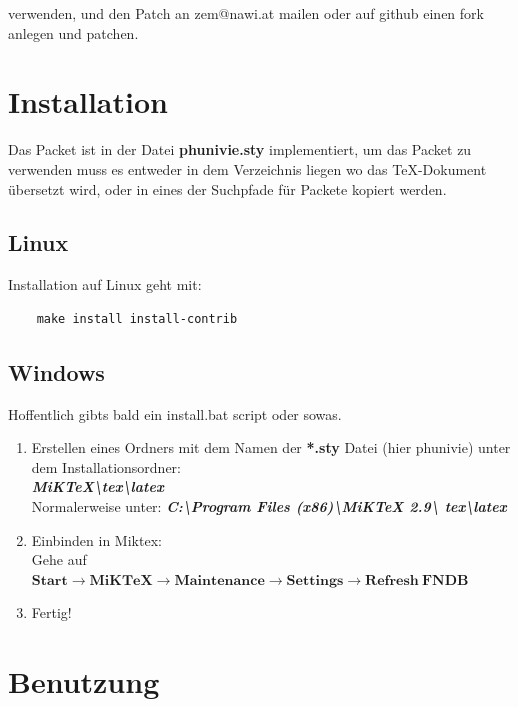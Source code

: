 \documentclass[a4paper]{article}
\begin{document}
verwenden, und den Patch an zem@nawi.at mailen oder auf github einen fork 
anlegen und patchen. 


\section{Installation}

Das Packet ist in der Datei {\bf phunivie.sty} implementiert, um das Packet zu 
verwenden muss es entweder in dem Verzeichnis liegen wo das \TeX-Dokument 
übersetzt wird, oder in eines der Suchpfade für Packete kopiert werden.\\



\subsection{Linux}

Installation auf Linux geht mit: 

\begin{verbatim}
	make install install-contrib
\end{verbatim}

\subsection{Windows}

Hoffentlich gibts bald ein install.bat script oder sowas. 

\begin{enumerate}
	\item Erstellen eines Ordners mit dem Namen der \textbf{\textbf{*.sty}} 
		Datei (hier phunivie) unter dem Installationsordner:\\

		\textbf{\emph{MiKTeX\textbackslash tex\textbackslash latex}}\\
		Normalerweise unter: \textbf{\emph{C:\textbackslash Program 
		Files (x86)\textbackslash MiKTeX 2.9\textbackslash 
		tex\textbackslash latex}}

	\item Einbinden in Miktex:\\
			Gehe auf $\boldsymbol{Start \rightarrow MiKTeX \rightarrow 
			Maintenance \rightarrow Settings \rightarrow Refresh~FNDB}$

	\item Fertig!
\end{enumerate}


\section{Benutzung}
\end{document}
